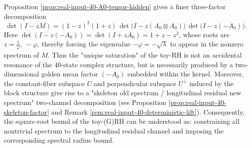 \begin{remark}\label{rem:finite-rh-40-hidden-minusA0}
Proposition \ref{prop:real-input-40-A0-tensor-hidden} gives a finer three-factor decomposition
\[
\det(I-zM)
=(1-z)^2(1+z)\,
\det\!\bigl(I-z(A_0\otimes A_0)\bigr)\,
\det\!\bigl(I-z(-A_0)\bigr).
\]
Here \(\det(I-z(-A_0))=\det(I+zA_0)=1+z-z^2\), whose roots are
\(
z=\frac{1}{\varphi},\ -\varphi
\),
thereby forcing the eigenvalue \(-\varphi=-\sqrt{\lambda}\) to appear in the nonzero spectrum of \(M\).
Thus the "unique saturation" of the toy-RH is not an accidental resonance of the \(40\)-state complex structure, but is necessarily produced by a two-dimensional golden mean factor \((-A_0)\) embedded within the kernel.
Moreover, the constant-fiber subspace \(U\) and perpendicular subspace \(U^\perp\) induced by the block structure give rise to a "skeleton old spectrum / longitudinal residual new spectrum" two-channel decomposition (see Proposition \ref{prop:real-input-40-skeleton-factor} and Remark \ref{rem:real-input-40-deterministic-lift}). Consequently, the square-root bound of the toy-(G)RH can be understood as: constraining all nontrivial spectrum to the longitudinal residual channel and imposing the corresponding spectral radius bound.
\end{remark}


